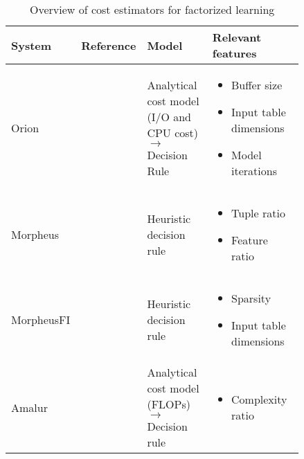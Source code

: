 \begin{table}[ht]
\centering
\begin{tabular}{p{0.15\linewidth}p{0.09\linewidth}p{0.25\linewidth}p{0.35\linewidth}}
\toprule
System     & Reference & Model & Relevant features                                                                                                                                        \\ \midrule \midrule
Orion      & \cite{orion_learning_gen_lin_models}          & Analytical cost model (I/O and CPU cost) $\rightarrow$ Decision Rule      & \begin{itemize}[noitemsep,topsep=0pt,leftmargin=0.3cm] \item Buffer size \item Input table dimensions \item Model iterations  \end{itemize} \\ \midrule
Morpheus   &  \cite{morpheus}         & Heuristic decision rule      & \begin{itemize}[noitemsep,topsep=0pt,leftmargin=0.3cm] \item Tuple ratio \item Feature ratio  \end{itemize}                                                        \\\midrule
MorpheusFI &   \cite{MorpheusFIEnablingOptimizingNonlinear2019}        & Heuristic decision rule      & \begin{itemize}[noitemsep,topsep=0pt,leftmargin=0.3cm] \item Sparsity \item Input table dimensions \end{itemize}                                                                               \\\midrule
Amalur     &   \cite{schijndel_cost_estimation}       & Analytical cost model (FLOPs) $\rightarrow$ Decision rule     & \begin{itemize}[noitemsep,topsep=0pt,leftmargin=00.3cm] \item Complexity ratio \end{itemize}                                                                \\
\bottomrule
\end{tabular}
\caption{Overview of cost estimators for factorized learning}
\label{tab:cost_model_overview}
\end{table}

